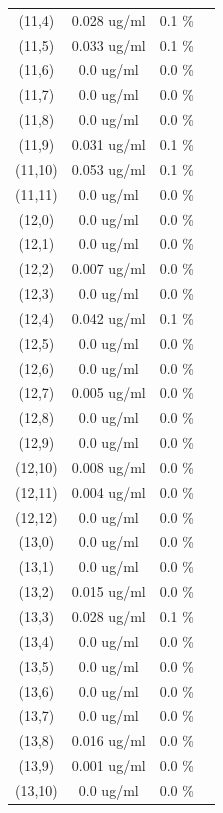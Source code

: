 \documentclass{article}
\begin{document}
\begin{tabular}{c c c c}
(11,4)&        0.028 ug/ml        &0.1 \%\\
(11,5)&        0.033 ug/ml        &0.1 \%\\
(11,6)&        0.0 ug/ml        &0.0 \%\\
(11,7)&        0.0 ug/ml        &0.0 \%\\
(11,8)&        0.0 ug/ml        &0.0 \%\\
(11,9)&        0.031 ug/ml        &0.1 \%\\
(11,10)&        0.053 ug/ml        &0.1 \%\\
(11,11)&        0.0 ug/ml        &0.0 \%\\
(12,0)&        0.0 ug/ml        &0.0 \%\\
(12,1)&        0.0 ug/ml        &0.0 \%\\
(12,2)&        0.007 ug/ml        &0.0 \%\\
(12,3)&        0.0 ug/ml        &0.0 \%\\
(12,4)&        0.042 ug/ml        &0.1 \%\\
(12,5)&        0.0 ug/ml        &0.0 \%\\
(12,6)&        0.0 ug/ml        &0.0 \%\\
(12,7)&        0.005 ug/ml        &0.0 \%\\
(12,8)&        0.0 ug/ml        &0.0 \%\\
(12,9)&        0.0 ug/ml        &0.0 \%\\
(12,10)&        0.008 ug/ml        &0.0 \%\\
(12,11)&        0.004 ug/ml        &0.0 \%\\
(12,12)&        0.0 ug/ml        &0.0 \%\\
(13,0)&        0.0 ug/ml        &0.0 \%\\
(13,1)&        0.0 ug/ml        &0.0 \%\\
(13,2)&        0.015 ug/ml        &0.0 \%\\
(13,3)&        0.028 ug/ml        &0.1 \%\\
(13,4)&        0.0 ug/ml        &0.0 \%\\
(13,5)&        0.0 ug/ml        &0.0 \%\\
(13,6)&        0.0 ug/ml        &0.0 \%\\
(13,7)&        0.0 ug/ml        &0.0 \%\\
(13,8)&        0.016 ug/ml        &0.0 \%\\
(13,9)&        0.001 ug/ml        &0.0 \%\\
(13,10)&        0.0 ug/ml        &0.0 \%\\

\end{tabular}
\end{document}
